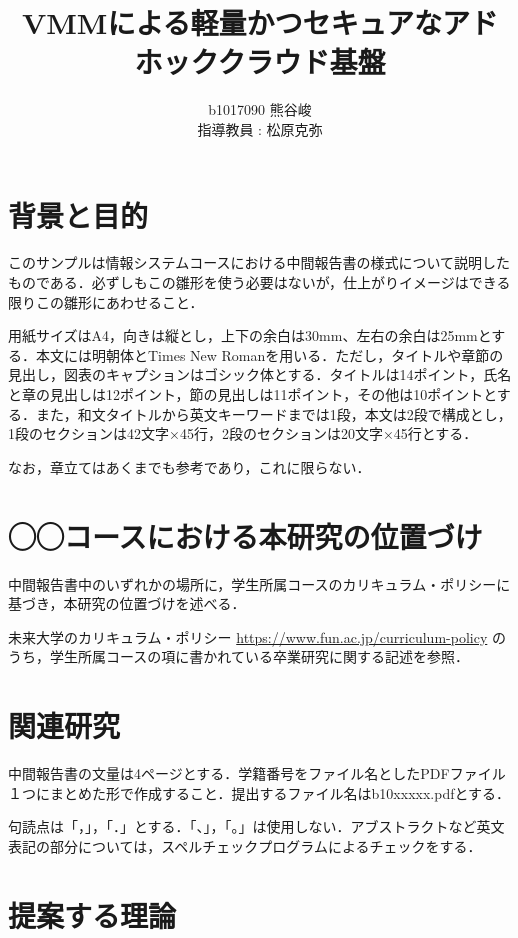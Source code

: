 \documentclass[11pt]{ujarticle} %
\author{%
b1017090 熊谷峻\\指導教員 : 松原克弥
}
\title{VMMによる軽量かつセキュアなアドホッククラウド基盤}
\begin{document}
\maketitle

\section{背景と目的}

このサンプルは情報システムコースにおける中間報告書の様式について説明したものである．必ずしもこの雛形を使う必要はないが，仕上がりイメージはできる限りこの雛形にあわせること．

用紙サイズはA4，向きは縦とし，上下の余白は30mm、左右の余白は25mmとする．本文には明朝体とTimes New Romanを用いる．ただし，タイトルや章節の見出し，図表のキャプションはゴシック体とする．タイトルは14ポイント，氏名と章の見出しは12ポイント，節の見出しは11ポイント，その他は10ポイントとする．また，和文タイトルから英文キーワードまでは1段，本文は2段で構成とし，1段のセクションは42文字×45行，2段のセクションは20文字×45行とする．

なお，章立てはあくまでも参考であり，これに限らない．

\section{◯◯コースにおける本研究の位置づけ}
中間報告書中のいずれかの場所に，学生所属コースのカリキュラム・ポリシーに基づき，本研究の位置づけを述べる．

未来大学のカリキュラム・ポリシー
\url{https://www.fun.ac.jp/curriculum-policy} のうち，学生所属コースの項に書かれている卒業研究に関する記述を参照．

\section{関連研究}

中間報告書の文量は4ページとする．学籍番号をファイル名としたPDFファイル１つにまとめた形で作成すること．提出するファイル名はb10xxxxx.pdfとする．

句読点は「，」，「．」とする．「、」，「。」は使用しない．アブストラクトなど英文表記の部分については，スペルチェックプログラムによるチェックをする．

\section{提案する理論}
\end{document}
